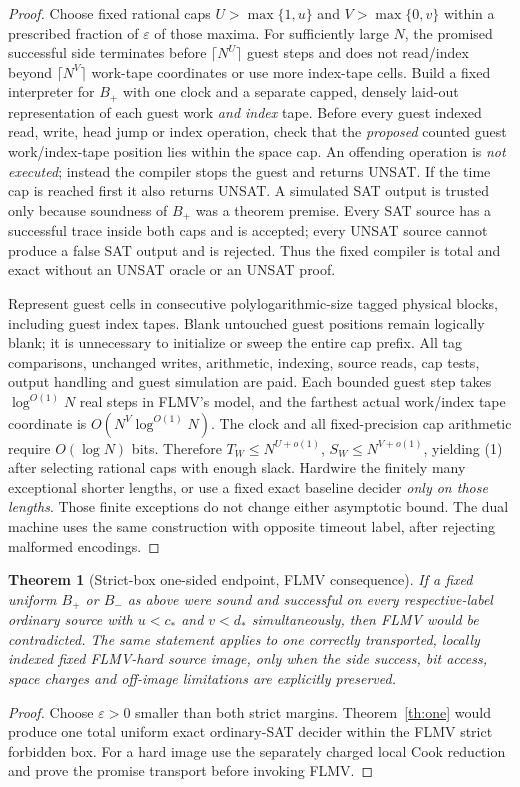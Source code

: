 \documentclass[11pt]{article}
\newtheorem{theorem}{Theorem}
\begin{document}
\begin{proof}
Choose fixed rational caps $U>\max\{1,u\}$ and
$V>\max\{0,v\}$ within a prescribed fraction of $\varepsilon$
of those maxima. For sufficiently large $N$, the promised successful
side terminates before $\lceil N^U\rceil$ guest steps and does not
read/index beyond $\lceil N^V\rceil$ work-tape coordinates or use more
index-tape cells. Build a fixed interpreter for $B_+$ with one
clock and a separate capped, densely laid-out representation of
each guest work \emph{and index} tape. Before every guest indexed
read, write, head jump or index operation, check that the
\emph{proposed} counted guest work/index-tape position lies within
the space cap. An offending operation is \emph{not executed};
instead the compiler stops the guest and returns UNSAT.
If the time cap is reached first it also returns UNSAT.
A simulated SAT output is trusted only because soundness of $B_+$
was a theorem premise. Every SAT source has a successful trace
inside both caps and is accepted; every UNSAT source cannot produce
a false SAT output and is rejected. Thus the fixed compiler is
total and exact without an UNSAT oracle or an UNSAT proof.

Represent guest cells in consecutive polylogarithmic-size tagged
physical blocks, including guest index tapes. Blank untouched
guest positions remain logically blank; it is unnecessary to
initialize or sweep the entire cap prefix. All tag comparisons,
unchanged writes, arithmetic, indexing, source reads, cap tests,
output handling and guest simulation are paid. Each bounded guest
step takes $\log^{O(1)}N$ real steps in FLMV's model, and the
farthest actual work/index tape coordinate is
$O(N^V\log^{O(1)}N)$. The clock and all fixed-precision
cap arithmetic require $O(\log N)$ bits. Therefore
$T_W\le N^{U+o(1)}$, $S_W\le N^{V+o(1)}$,
yielding (1) after selecting rational caps with enough slack.
Hardwire the finitely many exceptional shorter lengths, or
use a fixed exact baseline decider \emph{only on those lengths}.
Those finite exceptions do not change either asymptotic bound.
The dual machine uses the same construction with opposite timeout
label, after rejecting malformed encodings.
\end{proof}

\begin{theorem}[Strict-box one-sided endpoint, FLMV consequence]\label{th:box}
If a fixed uniform $B_+$ or $B_-$ as above were sound and
successful on \emph{every} respective-label ordinary source
with $u<c_*$ and $v<d_*$ simultaneously,
then FLMV would be contradicted. The same statement applies to
one correctly transported, locally indexed fixed FLMV-hard
source image, \emph{only when} the side success, bit access,
space charges and off-image limitations are explicitly preserved.
\end{theorem}
\begin{proof}
Choose $\varepsilon>0$ smaller than both strict margins.
Theorem~\ref{th:one} would produce one total uniform exact
ordinary-SAT decider within the FLMV strict forbidden box.
For a hard image use the separately charged local Cook reduction
and prove the promise transport before invoking FLMV.
\end{proof}
\end{document}
